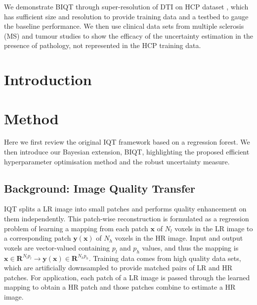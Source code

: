 We demonstrate BIQT through super-resolution of DTI on HCP dataset \cite{sotiropoulos2013advances}, which has sufficient size and resolution to provide training data and a testbed to gauge the baseline performance. We then use clinical data sets from multiple sclerosis (MS) and tumour studies to show the efficacy of the uncertainty estimation in the presence of pathology, not represented in the HCP training data.

\section{Introduction}



\section{Method}
Here we first review the original IQT framework based on a regression forest. We then introduce our Bayesian extension, BIQT, highlighting the proposed efficient hyperparameter optimisation method and the robust uncertainty measure. 

\subsection{Background: Image Quality Transfer}
IQT splits a LR image into small patches and performs quality enhancement on them independently. This patch-wise reconstruction is formulated as a regression problem of learning a mapping from each patch $\mathbf{x}$ of $N_l$ voxels in the LR image to a corresponding patch  $\mathbf{y}(\mathbf{x})$ of $N_h$ voxels in the HR image. Input and output voxels are vector-valued containing $p_l$ and $p_h$ values, and thus the mapping is $\mathbf{x}\in\mathbf{R}^{N_lp_l} \rightarrow \mathbf{y}(\mathbf{x})\in\mathbf{R}^{N_hp_h}$. Training data comes from high quality data sets, which are artificially downsampled to provide matched pairs of LR and HR patches. For application, each patch of a LR image is passed through the learned mapping to obtain a HR patch and those patches combine to estimate a HR image. 

